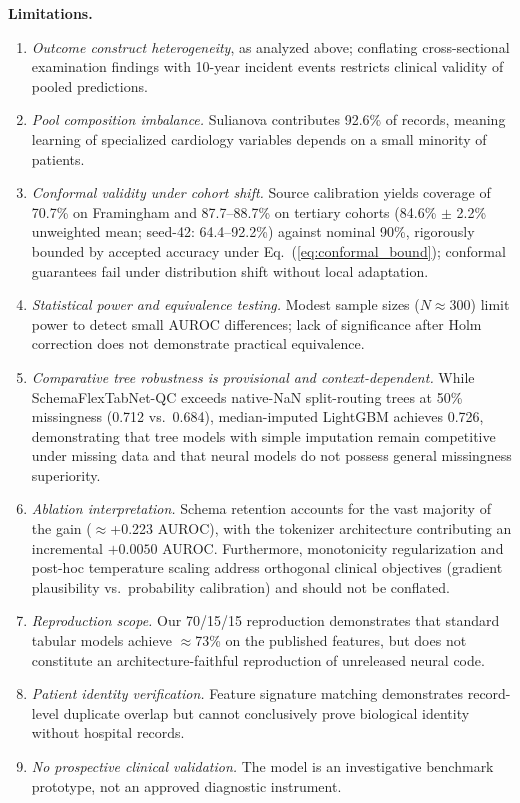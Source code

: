 \documentclass[journal]{IEEEtran}
\newcommand{\sfn}{SchemaFlexTabNet-QC}
\begin{document}
\textbf{Limitations.}
\begin{enumerate}
\item \emph{Outcome construct heterogeneity}, as analyzed above; conflating cross-sectional examination findings with 10-year incident events restricts clinical validity of pooled predictions.
\item \emph{Pool composition imbalance.} Sulianova contributes 92.6\% of records, meaning learning of specialized cardiology variables depends on a small minority of patients.
\item \emph{Conformal validity under cohort shift.} Source calibration yields coverage of 70.7\% on Framingham and 87.7--88.7\% on tertiary cohorts (84.6\% $\pm$ 2.2\% unweighted mean; seed-42: 64.4--92.2\%) against nominal 90\%, rigorously bounded by accepted accuracy under Eq.~(\ref{eq:conformal_bound}); conformal guarantees fail under distribution shift without local adaptation.
\item \emph{Statistical power and equivalence testing.} Modest sample sizes ($N\approx 300$) limit power to detect small AUROC differences; lack of significance after Holm correction does not demonstrate practical equivalence.
\item \emph{Comparative tree robustness is provisional and context-dependent.} While \sfn{} exceeds native-NaN split-routing trees at 50\% missingness (0.712 vs.\ 0.684), median-imputed LightGBM achieves 0.726, demonstrating that tree models with simple imputation remain competitive under missing data and that neural models do not possess general missingness superiority.
\item \emph{Ablation interpretation.} Schema retention accounts for the vast majority of the gain ($\approx$+0.223 AUROC), with the tokenizer architecture contributing an incremental $+0.0050$ AUROC. Furthermore, monotonicity regularization and post-hoc temperature scaling address orthogonal clinical objectives (gradient plausibility vs.\ probability calibration) and should not be conflated.
\item \emph{Reproduction scope.} Our 70/15/15 reproduction demonstrates that standard tabular models achieve $\approx$73\% on the published features, but does not constitute an architecture-faithful reproduction of unreleased neural code.
\item \emph{Patient identity verification.} Feature signature matching demonstrates record-level duplicate overlap but cannot conclusively prove biological identity without hospital records.
\item \emph{No prospective clinical validation.} The model is an investigative benchmark prototype, not an approved diagnostic instrument.
\end{enumerate}
\end{document}
